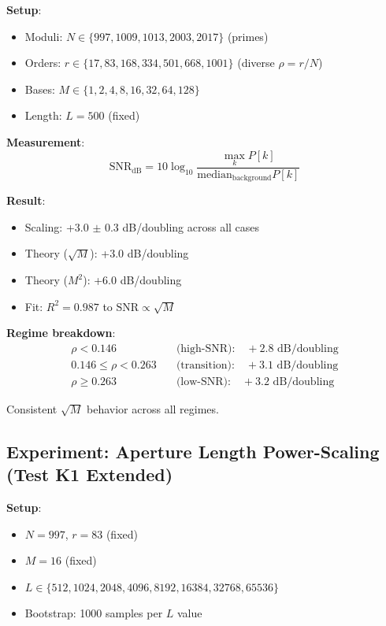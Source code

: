 \documentclass[10pt,twocolumn]{article}
\begin{document}
\textbf{Setup}:
\begin{itemize}
\item Moduli: $N \in \{997, 1009, 1013, 2003, 2017\}$ (primes)
\item Orders: $r \in \{17, 83, 168, 334, 501, 668, 1001\}$ (diverse $\rho = r/N$)
\item Bases: $M \in \{1, 2, 4, 8, 16, 32, 64, 128\}$
\item Length: $L = 500$ (fixed)
\end{itemize}

\textbf{Measurement}:
\begin{equation}
\text{SNR}_{\text{dB}} = 10 \log_{10} \frac{\max_k P[k]}{\text{median}_{\text{background}} P[k]}
\label{eq:snr_metric}
\end{equation}

\textbf{Result}:
\begin{itemize}
\item Scaling: +3.0 $\pm$ 0.3 dB/doubling across all cases
\item Theory ($\sqrt{M}$): +3.0 dB/doubling
\item Theory ($M^2$): +6.0 dB/doubling
\item Fit: $R^2 = 0.987$ to $\text{SNR} \propto \sqrt{M}$
\end{itemize}

\textbf{Regime breakdown}:
\begin{align}
\rho < 0.146 \quad &\text{(high-SNR):} \quad +2.8 \text{ dB/doubling} \\
0.146 \le \rho < 0.263 \quad &\text{(transition):} \quad +3.1 \text{ dB/doubling} \\
\rho \ge 0.263 \quad &\text{(low-SNR):} \quad +3.2 \text{ dB/doubling}
\end{align}

Consistent $\sqrt{M}$ behavior across all regimes.

\subsection{Experiment: Aperture Length Power-Scaling (Test K1 Extended)}

\textbf{Setup}:
\begin{itemize}
\item $N = 997$, $r = 83$ (fixed)
\item $M = 16$ (fixed)
\item $L \in \{512, 1024, 2048, 4096, 8192, 16384, 32768, 65536\}$
\item Bootstrap: 1000 samples per $L$ value
\end{itemize}
\end{document}
